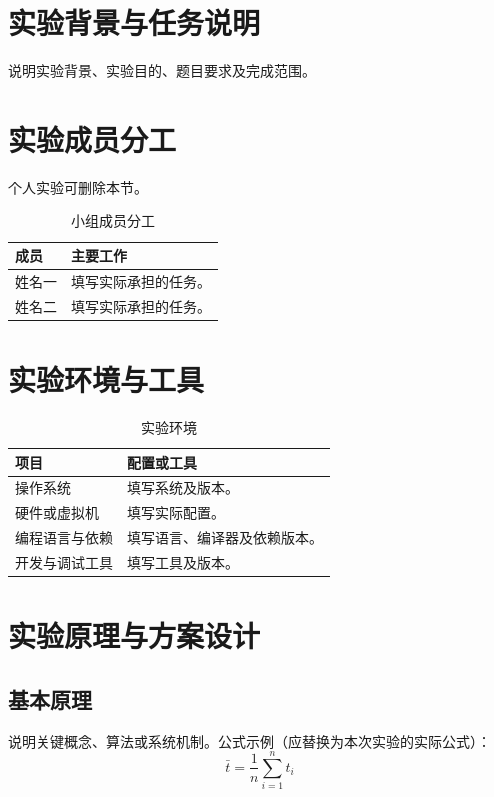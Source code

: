 \section{实验背景与任务说明}
说明实验背景、实验目的、题目要求及完成范围。

\section{实验成员分工}
个人实验可删除本节。
\begin{table}[H]
\centering
\caption{小组成员分工}
\begin{tabularx}{\textwidth}{p{3cm}X}
\toprule 成员 & 主要工作\\\midrule
姓名一 & 填写实际承担的任务。\\
姓名二 & 填写实际承担的任务。\\
\bottomrule
\end{tabularx}
\end{table}

\section{实验环境与工具}
\begin{table}[H]
\centering
\caption{实验环境}
\begin{tabularx}{\textwidth}{p{3cm}X}
\toprule 项目 & 配置或工具\\\midrule
操作系统 & 填写系统及版本。\\
硬件或虚拟机 & 填写实际配置。\\
编程语言与依赖 & 填写语言、编译器及依赖版本。\\
开发与调试工具 & 填写工具及版本。\\
\bottomrule
\end{tabularx}
\end{table}

\section{实验原理与方案设计}
\subsection{基本原理}
说明关键概念、算法或系统机制。公式示例（应替换为本次实验的实际公式）：
\begin{equation}
\bar{t}=\frac{1}{n}\sum_{i=1}^{n}t_i
\label{eq:mean}
\end{equation}

